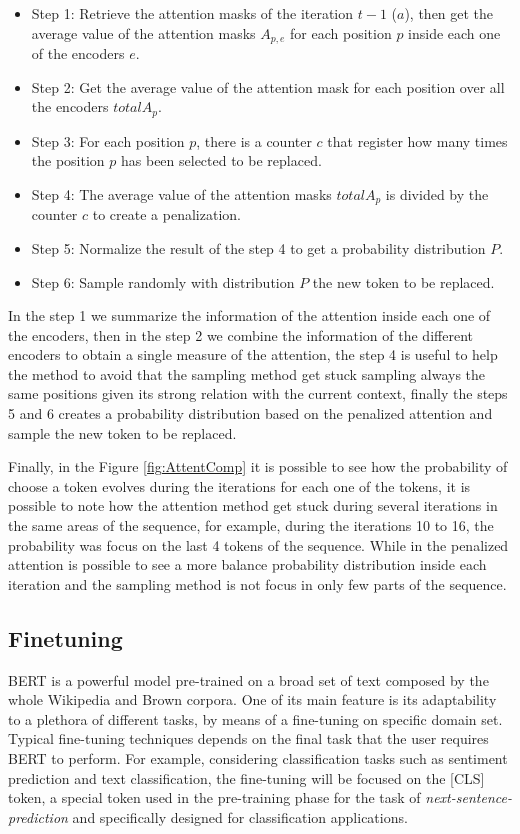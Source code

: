 \documentclass[10pt,twocolumn,letterpaper]{article}
\begin{document}
\begin{itemize}
\item Step 1: Retrieve the attention masks of the iteration $t-1$ ($a$), then get the average value of the attention masks $A_{p,e}$ for each position $p$ inside each one of the encoders $e$.
\item Step 2: Get the average value of the attention mask for each position over all the encoders $totalA_{p}$.
\item Step 3: For each position $p$, there is a counter $c$ that register how many times the position $p$ has been selected to be replaced.
\item Step 4: The average value of the attention masks $totalA_{p}$ is divided by the counter $c$ to create a penalization.
\item Step 5: Normalize the result of the step 4 to get a probability distribution $P$.
\item Step 6: Sample randomly with distribution $P$ the new token to be replaced.
\end{itemize}

In the step 1 we summarize the information of the attention inside each one of the encoders,
then in the step 2 we combine the information of the different encoders to obtain a single
measure of the attention, the step 4 is useful to help the method to avoid that the sampling
method get stuck sampling always the same positions given its strong relation with the current
context, finally the steps 5 and 6 creates a probability distribution based on the penalized attention
and sample the new token to be replaced.

Finally, in the Figure \ref{fig:AttentComp} it is possible to see how the probability of choose a token evolves
during the iterations for each one of the tokens, it is possible to note how the attention method
get stuck during several iterations in the same areas of the sequence, for example, during the iterations
10 to 16, the probability was focus on the last 4 tokens of the sequence.
While in the penalized attention is possible to see a more balance probability distribution inside each iteration
and the sampling method is not focus in only few parts of the sequence.
\subsection{Finetuning}
BERT is a powerful model pre-trained on a broad set of text composed by the whole
Wikipedia and Brown corpora.
One of its main feature is its adaptability to a plethora of different tasks,
by means of a fine-tuning on specific domain set.
Typical fine-tuning techniques depends on the final task that the user requires BERT to perform.
For example, considering classification tasks such as sentiment prediction and text classification,
the fine-tuning will be focused on the [CLS] token, a special token used in the pre-training phase for the task
of \textit{next-sentence-prediction} and specifically designed for classification applications.
\end{document}
